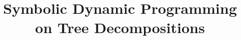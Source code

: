 \documentclass{article}
\title{Symbolic Dynamic Programming on Tree Decompositions}
\begin{document}
\maketitle




\newpage $ $
\newpage 


%

%




\appendix

\newpage
\clearpage 


%
%
%


%
\end{document}
